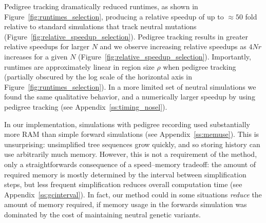 \documentclass{article}
\begin{document}
Pedigree tracking dramatically reduced runtimes, as shown in Figure~\ref{fig:runtimes_selection},
producing a relative speedup of up to $\approx 50$ fold relative to standard simulations that track neutral mutations
(Figure~\ref{fig:relative_speedup_selection}).
Pedigree tracking results in greater relative speedups for larger $N$
and we observe increasing relative speedups as $4Nr$ increases for a given $N$
(Figure~\ref{fig:relative_speedup_selection}).
Importantly, runtimes are approximately linear in region size $\rho$ when pedigree tracking
(partially obscured by the log scale of the horizontal axis in Figure~\ref{fig:runtimes_selection}).
In a more limited set of neutral simulations we found the same qualitative behavior,
and a numerically larger speedup by using pedigree tracking (see Appendix~\ref{ss:timing_nosel}).

In our implementation, simulations with pedigree recording
used substantially more RAM than simple forward simulations (see Appendix~\ref{ss:memuse}).
This is unsurprising:
unsimplified tree sequences grow quickly, and so storing history can use arbitrarily much memory.
However, this is not a requirement of the method, only a straightforwards consequence of a speed--memory tradeoff:
the amount of required memory is mostly determined by the interval between simplification steps,
but less frequent simplification reduces overall computation time (see Appendix~\ref{ss:gcinterval}).
In fact, our method could in some situations \emph{reduce} the amount of memory required,
if memory usage in the forwards simulation was dominated by the cost of maintaining neutral genetic variants.
\end{document}
